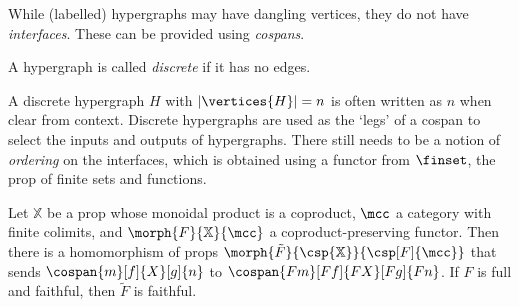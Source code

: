 While (labelled) hypergraphs may have dangling vertices, they do not have
\emph{interfaces}.
These can be provided using \emph{cospans}.


\begin{definition}
    A hypergraph is called \emph{discrete} if it has no edges.
\end{definition}

\noindent
A discrete hypergraph \(H\) with \(|\vertices{H}| = n\) is often written as
\(n\) when clear from context.
Discrete hypergraphs are used as the `legs' of a cospan to select the inputs and
outputs of hypergraphs.
There still needs to be a notion of \emph{ordering} on the interfaces, which is
obtained using a functor from \(\finset\), the prop of finite sets and
functions.

\begin{theorem}
    \label{thm:cospan-homomorphism}
    Let \(\mathbb{X}\) be a prop whose monoidal product is a coproduct, \(\mcc\)
    a category with finite colimits, and \(\morph{F}{\mathbb{X}}{\mcc}\) a
    coproduct-preserving functor.
    Then there is a homomorphism of props \(
        \morph{\tilde{F}}{\csp{\mathbb{X}}}{\csp[F]{\mcc}}
    \) that sends \(\cospan{m}[f]{X}[g]{n}\) to \(\cospan{Fm}[Ff]{FX}[Fg]{Fn}\).
    If \(F\) is full and faithful, then \(\tilde{F}\) is faithful.
\end{theorem}

